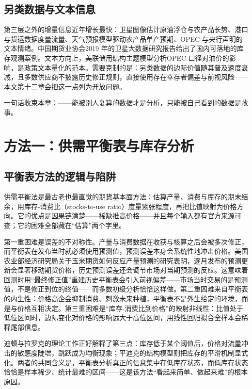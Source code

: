 \documentclass[12pt,a4paper]{ctexart}
\begin{document}
\subsection{另类数据与文本信息}

第三层之外的增量信息近年增长最快：卫星图像估计原油浮仓与农产品长势、港口与货运数据度量流量、天气预报模型驱动农产品单产预期、OPEC 与央行声明的文本情绪。中国期货业协会2019 年的卫星大数据研究报告给出了国内可落地的库存观测案例\cite{64}。文本方向上，美联储用结构主题模型分析OPEC 口径对油价的影响，是政策文本量化的范本\cite{54}。需要克制的是：另类数据的边际价值随其普及速度衰减，且多数供应商不披露历史修正规则，直接使用存在幸存者偏差与前视风险——本文第十二章会把这一点列为开放问题。

一句话收束本章：——能被别人复算的数据才是分析，只能被自己看到的数据是故事。

\section{方法一：供需平衡表与库存分析}

\subsection{平衡表方法的逻辑与陷阱}

供需平衡法是最古老也最直觉的期货基本面方法：估算产量、消费与库存的期末结余，用库存-消费比（stocks-to-use ratio）度量紧张程度，再把比值映射为价格方向。它的优点是因果链清楚——稀缺推高价格——并且每个输入都有官方来源可查；它的困难全部藏在“估算”两个字里。

第一重困难是误差的不对称性。产量与消费数据在收获与核算之后会被多次修正，而平衡表在发布当时就必须使用预测值，预测误差本身会系统性地冲击价格。美国农业部经济研究局关于玉米期货如何反应产量预测的研究表明，逐月发布的预测更新会显著移动期货价格，历史预测误差还会调节市场对当期预测的反应\cite{62}。这意味着回测时用“最终修正值”重建历史平衡表会引入前视偏差——市场当时交易的是预测值，不是修正到位的终值——而多数初级分析恰恰这样做。第二重困难来自平衡表的内生性：价格高企会抑制消费、刺激未来种植，平衡表不是外生给定的环境，而是与价格互相决定。第三重困难是“库存-消费比到价格”的映射非线性：比值处于低位区间时，边际变化对价格的影响远大于高位区间，用线性回归拟合全样本会稀释尾部信息。

迪顿与拉罗克的理论工作正好解释了第三点：库存低于某个阈值后，价格对流量冲击的敏感度陡增，跳跃成为均衡现象\cite{14}；平迪克的结构模型则把库存的平滑机制显式化\cite{15}。两者的共同含义是，平衡表分析真正的信息集中在低库存状态，而低库存状态恰恰是样本稀少、统计最难的区间——这是该方法“看起来简单、做起来难”的根本原因。
\end{document}
